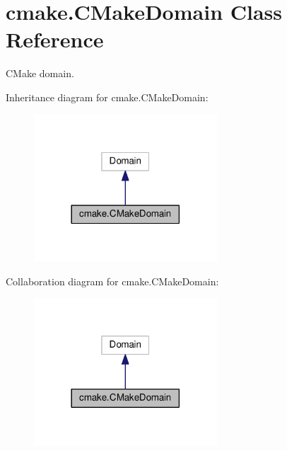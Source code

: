 \hypertarget{classcmake_1_1CMakeDomain}{}\section{cmake.\+C\+Make\+Domain Class Reference}
\label{classcmake_1_1CMakeDomain}


C\+Make domain.  




Inheritance diagram for cmake.\+C\+Make\+Domain\+:
\nopagebreak
\begin{figure}[H]
\begin{center}
\leavevmode
\includegraphics[width=194pt]{classcmake_1_1CMakeDomain__inherit__graph}
\end{center}
\end{figure}


Collaboration diagram for cmake.\+C\+Make\+Domain\+:
\nopagebreak
\begin{figure}[H]
\begin{center}
\leavevmode
\includegraphics[width=194pt]{classcmake_1_1CMakeDomain__coll__graph}
\end{center}
\end{figure}
